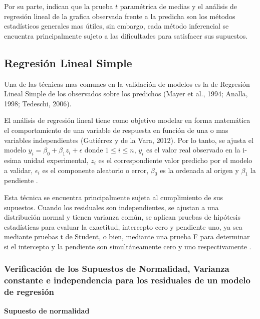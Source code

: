 Por su parte, \textcite{mayer-butler-1993} indican que la prueba $t$ paramétrica de medias y el análisis de regresión lineal de la grafica observada frente a la predicha son los métodos estadísticos generales mas útiles, sin embargo, cada método inferencial se encuentra principalmente sujeto a las dificultades para satisfacer sus supuestos.
\vspace{.5cm}



\subsection{Regresión Lineal Simple}
Una de las técnicas mas comunes en la validación de modelos es la de Regresión Lineal Simple de los observados sobre los predichos (Mayer et al., 1994; Analla, 1998; Tedeschi, 2006).
\vspace{.5cm}


El análisis de regresión lineal tiene como objetivo modelar en forma matemática el comportamiento de una variable de respuesta en función de una o mas variables independientes
(Gutiérrez y de la Vara, 2012). Por lo tanto, se ajusta el modelo  $ y_{i} = \beta_{0} + \beta_{1}z_{i} +\epsilon $ donde $ 1 \leq i \leq n$, $ y_{i}$ es el valor real observado en la i-esima unidad experimental, $ z_{i}$ es el correspondiente valor predicho por el modelo a validar, $\epsilon_{i}$ es el componente aleatorio o error, $\beta_{0}$ es la ordenada al origen y $\beta_{1}$ la pendiente \parencite{zacarias-2023}.
\vspace{.5cm}


Esta técnica se encuentra principalmente sujeta al cumplimiento de sus supuestos. Cuando los residuales son independientes, se ajustan a una distribución normal y tienen varianza común, se aplican pruebas de hipótesis estadísticas para evaluar la exactitud, intercepto cero y pendiente uno, ya sea mediante pruebas t de Student, o bien, mediante una prueba F para determinar si el intercepto y la pendiente son simultáneamente cero y uno respectivamente \parencite{balam-2012}.


\subsubsection{Verificación de los Supuestos de Normalidad, Varianza constante e independencia para los residuales de un modelo de regresión}


\textbf{Supuesto de normalidad}\\

